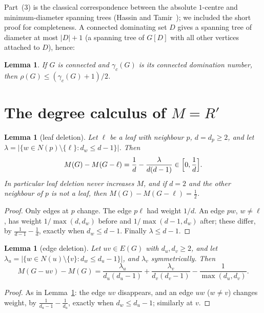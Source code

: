 \documentclass[11pt]{amsart}
\newtheorem{lemma}[theorem]{Lemma}
\theoremstyle{definition}
\newcommand{\Rp}{R'}
\begin{document}
Part~(3) is the classical correspondence between the absolute $1$-centre and minimum-diameter spanning trees
(Hassin and Tamir~\cite{HassinTamir}); we included the short proof for completeness. A connected dominating set $D$
gives a spanning tree of diameter at most $|D|+1$ (a spanning tree of $G[D]$ with all other vertices attached to
$D$), hence:

\begin{lemma}\label{lem:rho-gc}
If $G$ is connected and $\gamma_c(G)$ is its connected domination number, then $\rho(G)\le(\gamma_c(G)+1)/2$.
\end{lemma}

\section{The degree calculus of \texorpdfstring{$M=\Rp$}{M=R'}}\label{sec:calculus}

\begin{lemma}[leaf deletion]\label{lem:leafM}
Let $\ell$ be a leaf with neighbour $p$, $d=d_p\ge2$, and let
$\lambda=|\{w\in N(p)\setminus\{\ell\}: d_w\le d-1\}|$. Then
\[ M(G)-M(G-\ell)=\frac1d-\frac{\lambda}{d(d-1)}\in\Bigl[0,\frac1d\Bigr]. \]
In particular leaf deletion never increases $M$, and if $d=2$ and the other neighbour of $p$ is not a
leaf, then $M(G)-M(G-\ell)=\frac12$.
\end{lemma}
\begin{proof}
Only edges at $p$ change. The edge $p\ell$ had weight $1/d$. An edge $pw$, $w\ne\ell$, has weight
$1/\max(d,d_w)$ before and $1/\max(d-1,d_w)$ after; these differ, by $\frac1{d-1}-\frac1d$, exactly when
$d_w\le d-1$. Finally $\lambda\le d-1$.
\end{proof}

\begin{lemma}[edge deletion]\label{lem:edgeM}
Let $uv\in E(G)$ with $d_u,d_v\ge 2$, and let
$\lambda_u=|\{w\in N(u)\setminus\{v\}:d_w\le d_u-1\}|$, and $\lambda_v$ symmetrically. Then
\[ M(G-uv)-M(G)=\frac{\lambda_u}{d_u(d_u-1)}+\frac{\lambda_v}{d_v(d_v-1)}-\frac{1}{\max(d_u,d_v)} . \]
\end{lemma}
\begin{proof} As in Lemma~\ref{lem:leafM}: the edge $uv$ disappears, and an edge $uw$ ($w\ne v$) changes weight,
by $\frac1{d_u-1}-\frac1{d_u}$, exactly when $d_w\le d_u-1$; similarly at $v$. \end{proof}
\end{document}
